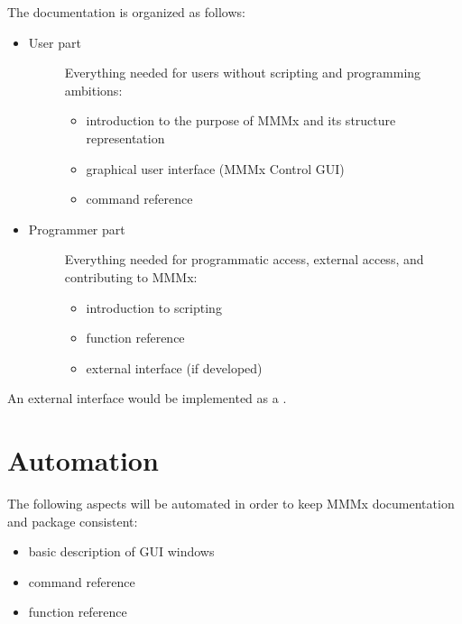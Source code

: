 \documentclass[letterpaper,10pt,english]{sphinxmanual}
\begin{document}
The documentation is organized as follows:
\begin{itemize}
\item {} \begin{description}
\item[{User part}] \leavevmode
Everything needed for users without scripting and programming ambitions:
\begin{itemize}
\item {} 
introduction to the purpose of MMMx and its structure representation

\item {} 
graphical user interface (MMMx Control GUI)

\item {} 
command reference

\end{itemize}

\end{description}

\item {} \begin{description}
\item[{Programmer part}] \leavevmode
Everything needed for programmatic access, external access, and contributing to MMMx:
\begin{itemize}
\item {} 
introduction to scripting

\item {} 
function reference

\item {} 
external interface (if developed)

\end{itemize}

\end{description}

\end{itemize}

An external interface would be implemented as a .


\section{Automation}
\label{\detokenize{docs:automation}}
The following aspects will be automated in order to keep MMMx documentation and package consistent:
\begin{itemize}
\item {} 
basic description of GUI windows

\item {} 
command reference

\item {} 
function reference

\end{itemize}
\end{document}
